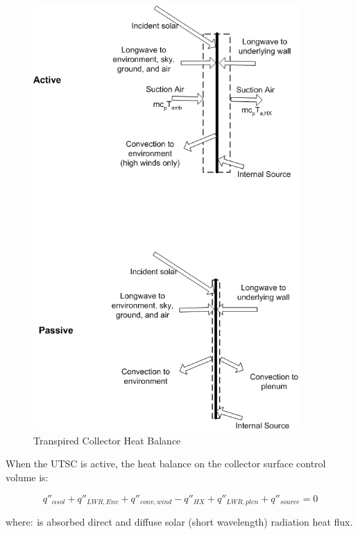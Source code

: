 \begin{figure}[hbtp] %
\centering
\includegraphics[width=0.9\textwidth, height=0.9\textheight, keepaspectratio=true]{media/image6620.png}
\caption{  Transpired Collector Heat Balance \protect \label{fig:transpired-collector-heat-balance}}
\end{figure}

When the UTSC is active, the heat balance on the collector surface control volume is:

\begin{equation}
{q''_{\alpha sol}} + {q''_{LWR,Env}} + {q''_{conv,wind}} - {q''_{HX}} + {q''_{LWR,plen}} + {q''_{source}} = 0
\end{equation}

where: \(_{ }\)is absorbed direct and diffuse solar (short wavelength) radiation heat flux.

